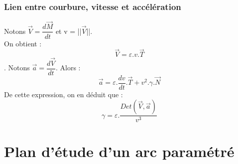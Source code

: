 \subsubsection{Lien entre courbure, vitesse et accélération}
Notons $\overrightarrow{V} = \dfrac{d\overrightarrow{M}}{dt}$ et v = ||$\overrightarrow{V}$||.\\
On obtient : 
$$\overrightarrow{V} = \varepsilon.v.\overrightarrow{T}$$.
Notons $\overrightarrow{a} = \dfrac{d\overrightarrow{V}}{dt}$. Alors : 
$$\overrightarrow{a} = \varepsilon.\dfrac{dv}{dt}.\overrightarrow{T}+v^2.\gamma.\overrightarrow{N}$$
De cette expression, on en déduit que : 
$$\gamma = \varepsilon.\dfrac{Det(\overrightarrow{V},\overrightarrow{a})}{v^3}$$
\section{Plan d'étude d'un arc paramétré}
